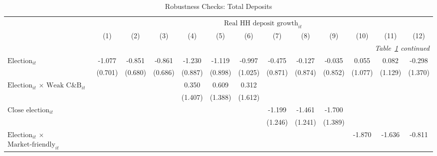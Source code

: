 \begin{longtable}{m{5cm}*{12}{c}}                                         \caption{Robustness Checks: Total Deposits\label{alldep1}}\\                                         \toprule                                         &\multicolumn{12}{c}{$\text{Real HH deposit growth}_{it}$} \\ \cmidrule(lr){2-13}
                    &         (1)   &         (2)   &         (3)   &         (4)   &         (5)   &         (6)   &         (7)   &         (8)   &         (9)   &        (10)   &        (11)   &        (12)   \\
\midrule\endfirsthead                                         \multicolumn{13}{r}{\textit{Table~\ref{alldep1} continued}} \\                                         \toprule\endhead\midrule\endfoot\endlastfoot
$\text{Election}_{it}$&      -1.077   &      -0.851   &      -0.861   &      -1.230   &      -1.119   &      -0.997   &      -0.475   &      -0.127   &      -0.035   &       0.055   &       0.082   &      -0.298   \\
                    &     (0.701)   &     (0.680)   &     (0.686)   &     (0.887)   &     (0.898)   &     (1.025)   &     (0.871)   &     (0.874)   &     (0.852)   &     (1.077)   &     (1.129)   &     (1.370)   \\
\multirow{2}{5cm}{$\text{Election}_{it}$ $\times$ $\text{Weak C\&B}_{it}$}&               &               &               &       0.350   &       0.609   &       0.312   &               &               &               &               &               &               \\
                    &               &               &               &     (1.407)   &     (1.388)   &     (1.612)   &               &               &               &               &               &               \\
\multirow{2}{5cm}{$\text{Close election}_{it}$}&               &               &               &               &               &               &      -1.199   &      -1.461   &      -1.700   &               &               &               \\
                    &               &               &               &               &               &               &     (1.246)   &     (1.241)   &     (1.389)   &               &               &               \\
\multirow{2}{5cm}{$\text{Election}_{it}$ $\times$ $\text{Market-friendly}_{it}$}&               &               &               &               &               &               &               &               &               &      -1.870   &      -1.636   &      -0.811   \\

\end{longtable}
